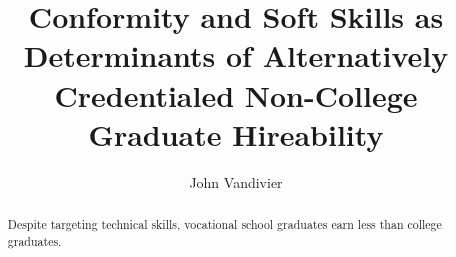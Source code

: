 \documentclass[review]{elsarticle}
\begin{document}
\begin{frontmatter}

    \title{
        Conformity and Soft Skills as Determinants of Alternatively Credentialed Non-College Graduate Hireability
    }

    \author[mymainaddress]{John Vandivier}
    \address[mymainaddress]{4400 University Dr, Fairfax, VA 22030}

    \begin{abstract}
        Despite targeting technical skills,
        vocational school graduates earn less than college graduates.

\end{abstract}
\end{frontmatter}
\end{document}
